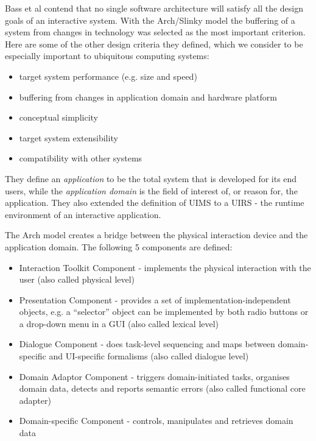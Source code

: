 	Bass et al \cite{Bass1992} contend that no single software architecture will satisfy all the design goals of an interactive system. With the Arch/Slinky model the buffering of a system from changes in technology was selected as the most important criterion. Here are some of the other design criteria they defined, which we consider to be especially important to ubiquitous computing systems:
	
	\begin{itemize}
		\item target system performance (e.g. size and speed)
		\item 	buffering from changes in application domain and hardware platform
		\item 	conceptual simplicity
		\item 	target system extensibility
		\item 	compatibility with other systems
	\end{itemize}
	
	 They define an \emph{application} to be the total system that is developed for its end users, while the \emph{application domain} is the field of interest of, or reason for, the application. They also extended the definition of \ac{UIMS} to a  \ac{UIRS} - the runtime environment of an interactive application.
	
	The Arch model creates a bridge between the physical interaction device and the application domain. The following 5 components are defined:
	
	\begin{itemize}
		\item Interaction Toolkit Component - implements the physical interaction with the user (also called physical level)
		\item Presentation Component - provides a set of im\-ple\-men\-ta\-tion-independent objects, e.g. a ``selector'' object can be implemented by both radio buttons or a drop-down menu in a GUI (also called lexical level)
		\item Dialogue Component - does task-level sequencing and maps between domain-specific and UI-specific formalisms (also called dialogue level)
		\item Domain Adaptor Component - triggers domain-initiated tasks, organises domain data, detects and reports semantic errors (also called functional core adapter)
		\item Domain-specific Component - controls, manipulates and retrieves domain data
	\end{itemize}


